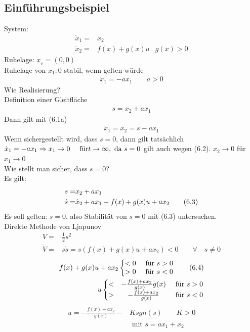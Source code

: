 \documentclass[11pt,a4paper]{article}
\begin{document}
\subsection{Einführungsbeispiel}
System: \begin{align}
\dot x_1 =& x_2\qquad & \tag{6.1a}\\
\dot x_2 =& f(x) + g(x)u &g(x)>0\tag{6.1b}
\end{align}
Ruhelage: $\underline x_e = (0,0)$\\
Ruhelage von $x_1: 0$ stabil, wenn gelten würde
\begin{align*}
\dot x_1 = -ax_1 \qquad a>0
\end{align*} 
Wie Realisierung?\\
Definition einer Gleitfläche
\begin{align}
s= x_2 + ax_1 \tag{6.2}
\end{align}
Dann gilt mit (6.1a) \begin{align*}\dot x_1 = x_2 = s-ax_1 \end{align*}
Wenn sichergestellt wird, dass $s=0$, dann gilt tatsächlich $\dot x_1 = -ax_1
\\ \Rightarrow x_1 \rightarrow 0 \quad \text{ für} t\to \infty, \text{ da } s=0 $ gilt auch wegen (6.2). $x_2 \to 0$ für $x_1\to 0$\\
Wie stellt man sicher, dass $s=0$?\\
Es gilt: \begin{align}
s= &x_2 + ax_1 \notag\\
\dot s =& \dot x_2 + ax_1-f(x) + g(x)u + ax_2 \tag{6.3}
\end{align}
Es soll gelten: $s=0$, also Stabilität von $s=0$ mit (6.3) untersuchen.\\
Direkte Methode von Ljapunov\\
\begin{align*}
V=&\frac{1}{2}s^2\\
\dot V=&s\dot s = s(f(x) + g(x)u + ax_2 )<0 \qquad \forall\quad  s\ne 0
\end{align*}
\begin{align}
f(x) + g(x)u + ax_2 \left\{ \begin{matrix} <0 & \text{ für } s>0\\ >0 &\text{ für } s<0 \end{matrix}\right.\tag{6.4}\\
u \left\{ \begin{matrix} <&-\frac{f(x) + ax_2}{g(x)}{g(x)}& \text{ für } s>0\\>&-\frac{f(x) + ax_2}{g(x)}& \text{ für } s<0 \end{matrix}\right.\notag
\end{align}
\begin{align*}u = -\frac{f(x) + ax_2}{g(x)} - &Ksgn(s) \qquad K>0\tag{6.4}\\ & \text{ mit } s=ax_1 + x_2\end{align*}
\end{document}
